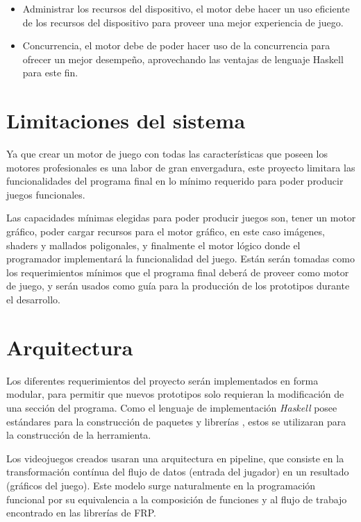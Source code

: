 \begin{itemize}
  \item Administrar los recursos del dispositivo, el motor debe hacer un uso eficiente de los recursos del dispositivo para proveer una mejor experiencia de juego.
  \item Concurrencia, el motor debe de poder hacer uso de la concurrencia para ofrecer un mejor desempeño, aprovechando las ventajas de lenguaje Haskell para este fin.
\end{itemize}

\section{Limitaciones del sistema}

Ya que crear un motor de juego con todas las características que poseen los motores profesionales es una labor de gran envergadura, este proyecto limitara las funcionalidades del programa final en lo mínimo requerido para poder producir juegos funcionales.

Las capacidades mínimas elegidas para poder producir juegos son, tener un  motor gráfico, poder cargar recursos para el motor gráfico, en este caso imágenes, shaders y mallados poligonales, y finalmente el motor lógico donde el programador implementará la funcionalidad del juego. Están serán tomadas como los requerimientos  mínimos que el programa final deberá de proveer como motor de juego, y serán usados como guía para la producción de los prototipos durante el desarrollo.

\section{Arquitectura}

Los diferentes requerimientos del proyecto serán implementados en forma modular, para permitir que nuevos prototipos solo requieran la modificación de una sección del programa. Como el lenguaje de implementación \emph{Haskell} posee estándares para la construcción de paquetes y librerías \cite{wiki:WriteAHaskellProgram}, estos se utilizaran para la construcción de la herramienta.

Los videojuegos creados usaran una arquitectura en pipeline, que consiste en la transformación contínua del flujo de datos (entrada del jugador) en un resultado (gráficos del juego). Este modelo surge naturalmente en la programación funcional por su equivalencia a la composición de funciones y al flujo de trabajo encontrado en las librerías de FRP.

